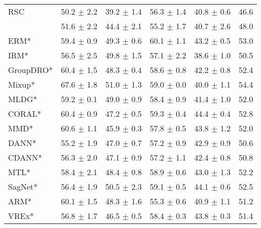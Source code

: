 \begin{table*}
\begin{center}
\begin{tabular}{lccccc}
RSC                  & 50.2 $\pm$ 2.2       & 39.2 $\pm$ 1.4       & 56.3 $\pm$ 1.4       & 40.8 $\pm$ 0.6       & 46.6                  \\
\divcams 	        & 51.6 $\pm$ 2.2       & 44.4 $\pm$ 2.1        & 55.2 $\pm$ 1.7       & 40.7 $\pm$ 2.6        & 48.0                 \\
\midrule
ERM*                  & 59.4 $\pm$ 0.9       & 49.3 $\pm$ 0.6       & 60.1 $\pm$ 1.1       & 43.2 $\pm$ 0.5       & 53.0                 \\
IRM*                  & 56.5 $\pm$ 2.5       & 49.8 $\pm$ 1.5       & 57.1 $\pm$ 2.2       & 38.6 $\pm$ 1.0       & 50.5                 \\
GroupDRO*             & 60.4 $\pm$ 1.5       & 48.3 $\pm$ 0.4       & 58.6 $\pm$ 0.8       & 42.2 $\pm$ 0.8       & 52.4                 \\
Mixup*                & 67.6 $\pm$ 1.8       & 51.0 $\pm$ 1.3       & 59.0 $\pm$ 0.0       & 40.0 $\pm$ 1.1       & 54.4                 \\
MLDG*                 & 59.2 $\pm$ 0.1       & 49.0 $\pm$ 0.9       & 58.4 $\pm$ 0.9       & 41.4 $\pm$ 1.0       & 52.0                 \\
CORAL*                & 60.4 $\pm$ 0.9       & 47.2 $\pm$ 0.5       & 59.3 $\pm$ 0.4       & 44.4 $\pm$ 0.4       & 52.8                 \\
MMD*                  & 60.6 $\pm$ 1.1       & 45.9 $\pm$ 0.3       & 57.8 $\pm$ 0.5       & 43.8 $\pm$ 1.2       & 52.0                 \\
DANN*                 & 55.2 $\pm$ 1.9       & 47.0 $\pm$ 0.7       & 57.2 $\pm$ 0.9       & 42.9 $\pm$ 0.9       & 50.6                 \\
CDANN*                & 56.3 $\pm$ 2.0       & 47.1 $\pm$ 0.9       & 57.2 $\pm$ 1.1       & 42.4 $\pm$ 0.8       & 50.8                 \\
MTL*                  & 58.4 $\pm$ 2.1       & 48.4 $\pm$ 0.8       & 58.9 $\pm$ 0.6       & 43.0 $\pm$ 1.3       & 52.2                 \\
SagNet*               & 56.4 $\pm$ 1.9       & 50.5 $\pm$ 2.3       & 59.1 $\pm$ 0.5       & 44.1 $\pm$ 0.6       & 52.5                 \\
ARM*                  & 60.1 $\pm$ 1.5       & 48.3 $\pm$ 1.6       & 55.3 $\pm$ 0.6       & 40.9 $\pm$ 1.1       & 51.2                 \\
VREx*                 & 56.8 $\pm$ 1.7       & 46.5 $\pm$ 0.5       & 58.4 $\pm$ 0.3       & 43.8 $\pm$ 0.3       & 51.4                 \\

\end{tabular}
\end{center}
\end{table*}
